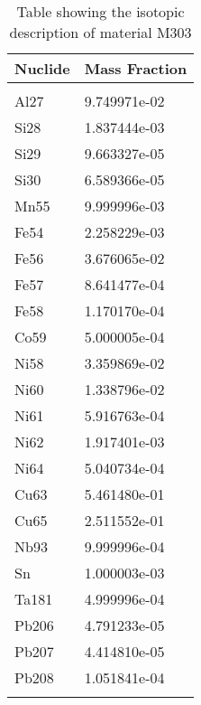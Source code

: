 \begin{centering}
\begin{longtable}[ht!]
\caption{Table showing the isotopic description of material PPWater}
\label{table:material_PPWater}
\end{longtable}\clearpage

\begin{longtable}[ht!]
{ p{} | p{} }
\hline
Nuclide & Mass Fraction\\
\hline
\\
Al27 & 9.749971e-02\\
Si28 & 1.837444e-03\\
Si29 & 9.663327e-05\\
Si30 & 6.589366e-05\\
Mn55 & 9.999996e-03\\
Fe54 & 2.258229e-03\\
Fe56 & 3.676065e-02\\
Fe57 & 8.641477e-04\\
Fe58 & 1.170170e-04\\
Co59 & 5.000005e-04\\
Ni58 & 3.359869e-02\\
Ni60 & 1.338796e-02\\
Ni61 & 5.916763e-04\\
Ni62 & 1.917401e-03\\
Ni64 & 5.040734e-04\\
Cu63 & 5.461480e-01\\
Cu65 & 2.511552e-01\\
Nb93 & 9.999996e-04\\
Sn & 1.000003e-03\\
Ta181 & 4.999996e-04\\
Pb206 & 4.791233e-05\\
Pb207 & 4.414810e-05\\
Pb208 & 1.051841e-04\\

\caption{Table showing the isotopic description of material M303}
\label{table:material_M303}
\end{longtable}\clearpage


\end{centering}
